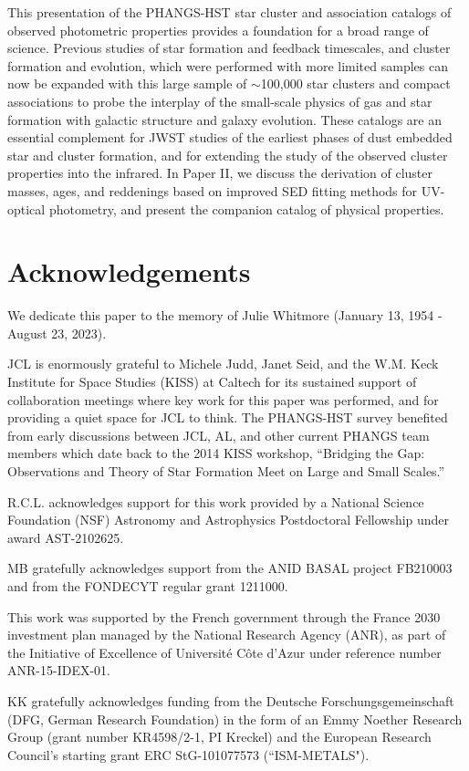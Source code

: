 \documentclass[]{aastex631}
\begin{document}
This presentation of the PHANGS-HST star cluster and association catalogs of observed photometric properties provides a foundation for a broad range of science. Previous studies of star formation and feedback timescales, and cluster formation and evolution, which were performed with more limited samples can now be expanded with this large sample of $\sim$100,000 star clusters and compact associations to probe the interplay of the small-scale physics of gas and star formation with galactic structure and galaxy evolution.  These catalogs are an essential complement for JWST studies of the earliest phases of dust embedded star and cluster formation, and for extending the study of the observed cluster properties into the infrared.  In Paper II, we discuss the derivation of cluster masses, ages, and reddenings based on improved SED fitting methods for UV-optical photometry, and present the companion catalog of physical properties.  


\section*{Acknowledgements}
We dedicate this paper to the memory of Julie Whitmore (January 13, 1954 - August 23, 2023).

JCL is enormously grateful to Michele Judd, Janet Seid, and the W.M. Keck Institute for Space Studies (KISS) at Caltech for its sustained support of collaboration meetings where key work for this paper was performed, and for providing a quiet space for JCL to think.  The PHANGS-HST survey benefited from early discussions between JCL, AL, and other current PHANGS team members which date back to the 2014 KISS workshop, ``Bridging the Gap: Observations and Theory of Star Formation Meet on Large and Small Scales.''

R.C.L. acknowledges support for this work provided by a National Science Foundation (NSF) Astronomy and Astrophysics Postdoctoral Fellowship under award AST-2102625.

MB gratefully acknowledges support from the ANID BASAL project FB210003 and from the FONDECYT regular grant 1211000.

This work was supported by the French government through the France 2030 investment plan managed by the National Research Agency (ANR), as part of the Initiative of Excellence of Université Côte d’Azur under reference number ANR-15-IDEX-01.

KK gratefully acknowledges funding from the Deutsche Forschungsgemeinschaft (DFG, German Research Foundation) in the form of an Emmy Noether Research Group (grant number KR4598/2-1, PI Kreckel) and the European Research Council’s starting grant ERC StG-101077573 (“ISM-METALS"). 
\end{document}
